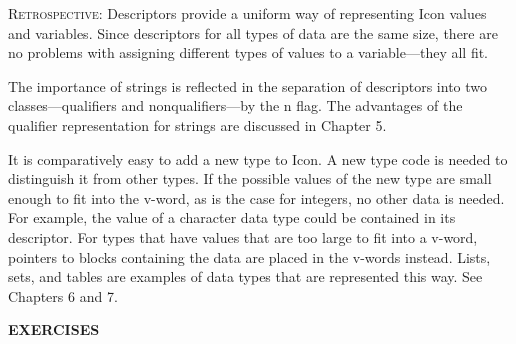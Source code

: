 \textsc{Retrospective}: Descriptors provide a uniform way of
representing Icon values and variables. Since descriptors for all
types of data are the same size, there are no problems with assigning
different types of values to a variable---they all fit.

The importance of strings is reflected in the separation of
descriptors into two classes---qualifiers and nonqualifiers---by the n
flag. The advantages of the qualifier representation for strings are
discussed in Chapter 5.

It is comparatively easy to add a new type to Icon. A new type code is
needed to distinguish it from other types. If the possible values of
the new type are small enough to fit into the v-word, as is the case
for integers, no other data is needed. For example, the value of a
character data type could be contained in its descriptor. For types
that have values that are too large to fit into a v-word, pointers to
blocks containing the data are placed in the v-words instead. Lists,
sets, and tables are examples of data types that are represented this
way. See Chapters 6 and 7.

\bigskip

{\sffamily\bfseries
EXERCISES}

